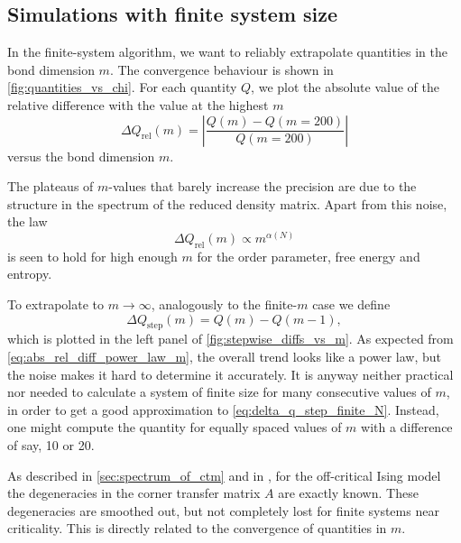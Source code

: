 \subsection{Simulations with finite system size}
In the finite-system algorithm, we want to reliably extrapolate quantities in the bond dimension $m$.
The convergence behaviour is shown in \autoref{fig:quantities_vs_chi}.
For each quantity $Q$, we plot the absolute value of the relative difference with the value at the highest $m$
\begin{equation}\label{eq:abs_rel_diff_quantity_m}
  \Delta Q_{\text{rel}}(m) = \left| \frac{Q(m) - Q(m = 200)}{Q(m = 200)} \right|
\end{equation}
versus the bond dimension $m$.

The plateaus of $m$-values that barely increase the precision are due to the structure in the spectrum of the reduced
density matrix. Apart from this noise, the law
\begin{equation}\label{eq:abs_rel_diff_power_law_m}
  \Delta Q_{\text{rel}}(m) \propto m^{\alpha(N)}
\end{equation}
is seen to hold for high enough $m$ for the order parameter, free energy and entropy.


To extrapolate to $m \to \infty$, analogously to the finite-$m$ case we define
\begin{equation}\label{eq:delta_q_step_finite_N}
  \Delta Q_{\text{step}}(m) = Q(m) - Q(m - 1),
\end{equation}
which is plotted in the left panel of \autoref{fig:stepwise_diffs_vs_m}.
As expected from \autoref{eq:abs_rel_diff_power_law_m}, the overall trend looks like a power law,
but the noise makes it hard to determine it accurately.
It is anyway neither practical nor needed to calculate a system of finite size for many consecutive values of $m$,
in order to get a good approximation to \autoref{eq:delta_q_step_finite_N}.
Instead, one might compute the quantity for equally spaced values of $m$ with a difference of say,
10 or 20.

As described in \autoref{sec:spectrum_of_ctm} and in \cite{okunishi1999universal,
davies1988corner, peschel2009reduced}, for the off-critical Ising model the degeneracies in the corner transfer matrix
$A$ are exactly known.
These degeneracies are smoothed out, but not completely lost for finite systems near criticality. This is directly related to the convergence of quantities in $m$.

